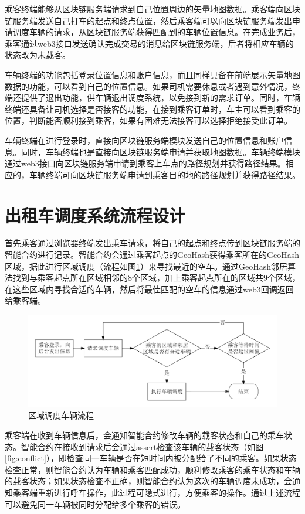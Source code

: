 乘客终端能够从区块链服务端请求到自己位置周边的矢量地图数据。乘客端向区块链服务端发送自己打车的起点和终点位置，然后乘客端可以向区块链服务端发出申请调度车辆的请求，从区块链服务端获得匹配到的车辆位置信息。在完成业务后，乘客通过web3接口发送确认完成交易的消息给区块链服务端，后者将相应车辆的状态改为未载客。

车辆终端的功能包括登录位置信息和账户信息，而且同样具备在前端展示矢量地图数据的功能，可以看到自己的位置信息。如果司机需要休息或者遇到意外情况，终端还提供了退出功能，供车辆退出调度系统，以免接到新的需求订单。同时，车辆终端还具备让司机选择是否接客的功能，在接到乘客订单时，车主可以看到乘客的位置，判断能否顺利接到乘客，如果有困难无法接客可以选择拒绝接受此订单。

车辆终端在进行登录时，直接向区块链服务端模块发送自己的位置信息和账户信息。同时，车辆终端也是直接向区块链服务端申请并获取地图数据。车辆终端模块通过web3接口向区块链服务端申请到乘客上车点的路径规划并获得路径结果。相应的，车辆终端可向区块链服务端申请到乘客目的地的路径规划并获得路径结果。

\section{出租车调度系统流程设计}
首先乘客通过浏览器终端发出乘车请求，将自己的起点和终点传到区块链服务端的智能合约进行记录。智能合约会通过乘客起点的GeoHash获得乘客所在的GeoHash区域，据此进行区域调度（流程如图\ref{fig:region}）来寻找最近的空车。通过GeoHash邻居算法找到与乘客起点所在区域相邻的8个区域，加上乘客起点所在的区域共9个区域，在这些区域内寻找合适的车辆，然后将最佳匹配的空车的信息通过web3回调返回给乘客端。

\begin{figure}[h]
  \centering
  \includegraphics[width=1.0\textwidth]{figures/区域调度车辆流程}
  \caption{区域调度车辆流程}\label{fig:region}
\end{figure}

乘客端在收到车辆信息后，会通知智能合约修改车辆的载客状态和自己的乘车状态。智能合约在接收到请求后会通过assert检查该车辆的载客状态（如图\ref{fig:conflict}），即检查同一车辆是否在短时间内被分配给了不同的乘客。如果状态检查正常，则智能合约认为车辆和乘客匹配成功，顺利修改乘客的乘车状态和车辆的载客状态；如果状态检查不正确，则智能合约认为这次的车辆调度未成功，会通知乘客端重新进行呼车操作，此过程可隐式进行，方便乘客的操作。通过上述流程可以避免同一车辆被同时分配给多个乘客的错误。

